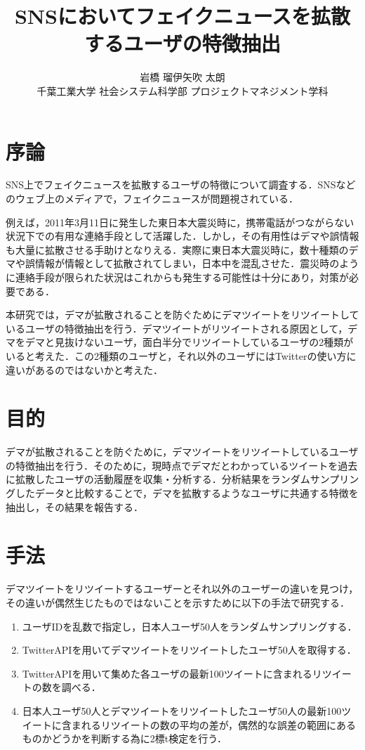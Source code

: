 \documentclass[uplatex,twocolumn]{jsarticle}
\title{\vspace{-10mm}\Large{SNSにおいてフェイクニュースを拡散するユーザの特徴抽出}\footnotemark[0]}%
\author{\large{岩橋 瑠伊\footnotemark[2]\qquad 矢吹 太朗}\\千葉工業大学 社会システム科学部 プロジェクトマネジメント学科\footnotemark[3]}%
\date{}
\begin{document}
\twocolumn[\maketitle]

\begingroup
\def\thefootnote{\fnsymbol{footnote}}
\endgroup

\section{序論}
SNS上でフェイクニュースを拡散するユーザの特徴について調査する．SNSなどのウェブ上のメディアで，フェイクニュースが問題視されている\cite{dema1}．

例えば，2011年3月11日に発生した東日本大震災時に，携帯電話がつながらない状況下での有用な連絡手段として活躍した．しかし，その有用性はデマや誤情報も大量に拡散させる手助けとなりえる．実際に東日本大震災時に，数十種類のデマや誤情報が情報として拡散されてしまい，日本中を混乱させた．震災時のように連絡手段が限られた状況はこれからも発生する可能性は十分にあり，対策が必要である\cite{dema2}．

本研究では，デマが拡散されることを防ぐためにデマツイートをリツイートしているユーザの特徴抽出を行う．デマツイートがリツイートされる原因として，デマをデマと見抜けないユーザ，面白半分でリツイートしているユーザの2種類がいると考えた．この2種類のユーザと，それ以外のユーザにはTwitterの使い方に違いがあるのではないかと考えた．

\section{目的}
デマが拡散されることを防ぐために，デマツイートをリツイートしているユーザの特徴抽出を行う．そのために，現時点でデマだとわかっているツイートを過去に拡散したユーザの活動履歴を収集・分析する．分析結果をランダムサンプリングしたデータと比較することで，デマを拡散するようなユーザに共通する特徴を抽出し，その結果を報告する．

\section{手法}
デマツイートをリツイートするユーザーとそれ以外のユーザーの違いを見つけ，その違いが偶然生じたものではないことを示すために以下の手法で研究する．
\begin{enumerate}
\item ユーザIDを乱数で指定し，日本人ユーザ50人をランダムサンプリングする．
\item TwitterAPIを用いてデマツイートをリツイートしたユーザ50人を取得する．
\item TwitterAPIを用いて集めた各ユーザの最新100ツイートに含まれるリツイートの数を調べる．
\item 日本人ユーザ50人とデマツイートをリツイートしたユーザ50人の最新100ツイートに含まれるリツイートの数の平均の差が，偶然的な誤差の範囲にあるものかどうかを判断する為に2標t検定を行う．
\end{enumerate}
\end{document}
